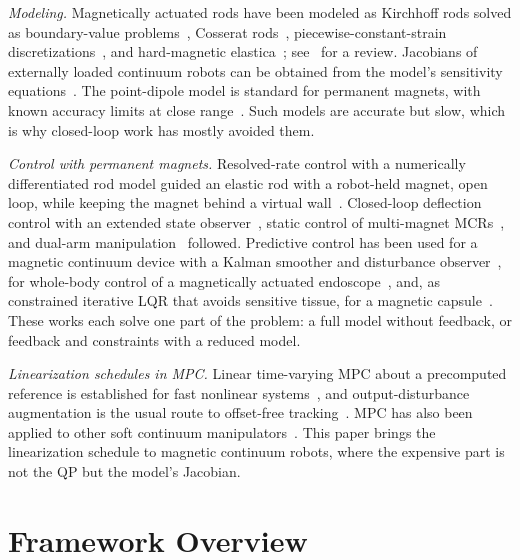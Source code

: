 \documentclass[journal]{IEEEtran}
\begin{document}
\emph{Modeling.} Magnetically actuated rods have been modeled as Kirchhoff
rods solved as boundary-value problems~\cite{kratchman2017guiding},
Cosserat rods~\cite{rucker2010geometrically,edelmann2017magnetic,
till2019realtime}, piecewise-constant-strain
discretizations~\cite{renda2018discrete}, and hard-magnetic
elastica~\cite{wang2020hardmagnetic}; see~\cite{alessi2024rod} for a
review. Jacobians of externally loaded continuum robots can be obtained
from the model's sensitivity equations~\cite{rucker2011computing}. The
point-dipole model is standard for permanent magnets, with known accuracy
limits at close range~\cite{petruska2013optimal}. Such models are accurate
but slow, which is why closed-loop work has mostly avoided them.

\emph{Control with permanent magnets.} Resolved-rate control with a
numerically differentiated rod model guided an elastic rod with a
robot-held magnet, open loop, while keeping the magnet behind a virtual
wall~\cite{kratchman2017guiding}. Closed-loop deflection control with an
extended state observer~\cite{wu2025closedloop}, static control of
multi-magnet MCRs~\cite{pittiglio2023closedloop}, and dual-arm
manipulation~\cite{pittiglio2023collaborative} followed. Predictive control
has been used for a magnetic continuum device with a Kalman smoother and
disturbance observer~\cite{pratt2023observed}, for whole-body control of a
magnetically actuated endoscope~\cite{xu2025wholebody}, and, as
constrained iterative LQR that avoids sensitive tissue, for a magnetic
capsule~\cite{isitman2024trajectory}. These works each solve one part of
the problem: a full model without feedback, or feedback and constraints
with a reduced model.

\emph{Linearization schedules in MPC.} Linear time-varying MPC about a
precomputed reference is established for fast nonlinear
systems~\cite{falcone2007predictive}, and output-disturbance augmentation
is the usual route to offset-free tracking~\cite{maeder2009linear,
rawlings2017mpc}. MPC has also been applied to other soft continuum
manipulators~\cite{spinelli2022unified,bruder2021koopman}. This paper
brings the linearization schedule to magnetic continuum robots, where the
expensive part is not the QP but the model's Jacobian.

\section{Framework Overview}
\label{sec:framework}
\end{document}
